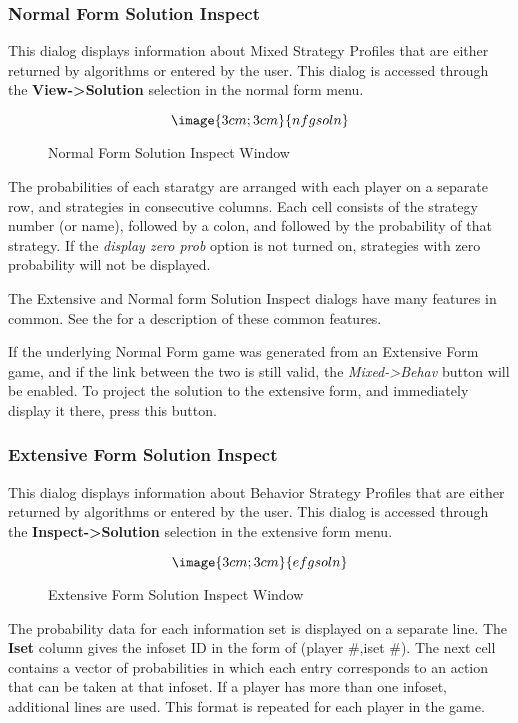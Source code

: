 \subsubsection{Normal Form Solution Inspect}\label{NormalSolutionInspect}

This dialog displays information about Mixed Strategy Profiles that
are either returned by algorithms or entered by the user.  This dialog
is accessed through the {\bf View->Solution} selection in the normal
form menu.  

\begin{figure}
$$\image{3cm;3cm}{nfgsoln}$$
\caption{Normal Form Solution Inspect Window}\label{fig_nfgsoln}
\end{figure}

The probabilities of each staratgy are arranged with each player on a
separate row, and strategies in consecutive columns.  Each cell
consists of the strategy number (or name), followed by a colon, and
followed by the probability of that strategy.  If the {\em display
zero prob} option is not turned on, strategies with zero probability
will not be displayed.

The Extensive and Normal form Solution Inspect dialogs have many
features in common.  See the  for a description of these common features.

If the underlying Normal Form game was generated from an Extensive
Form game, and if the link between the two is still valid, the {\em
Mixed->Behav} button will be enabled.  To project the solution to the
extensive form, and immediately display it there, press this button.

\subsubsection{Extensive Form Solution Inspect}\label{ExtensiveSolutionInspect}

This dialog displays information about Behavior Strategy Profiles that
are either returned by algorithms or entered by the user.  This dialog
is accessed through the {\bf Inspect->Solution} selection in the
extensive form menu.

\begin{figure}
$$\image{3cm;3cm}{efgsoln}$$
\caption{Extensive Form Solution Inspect Window}\label{fig_efgsoln}
\end{figure}

The probability data for each information set is displayed on a
separate line.  The {\bf Iset} column gives the infoset ID in the form
of (player \#,iset \#).  The next cell contains a vector of
probabilities in which each entry corresponds to an action that can be
taken at that infoset.  If a player has more than one infoset,
additional lines are used.  This format is repeated for each player in
the game.

